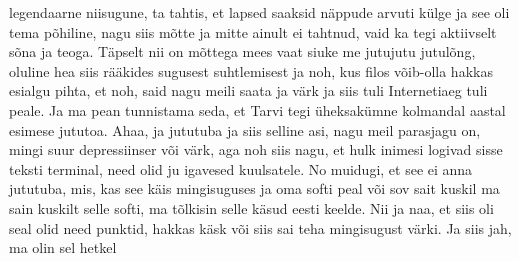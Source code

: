legendaarne niisugune, ta tahtis, et lapsed saaksid näppude arvuti külge ja see oli tema põhiline, nagu siis mõtte ja mitte ainult ei tahtnud, vaid ka tegi aktiivselt sõna ja teoga. Täpselt nii on mõttega mees vaat siuke me jutujutu jutulõng, oluline hea siis rääkides sugusest suhtlemisest ja noh, kus filos võib-olla hakkas esialgu pihta, et noh, said nagu meili saata ja värk ja siis tuli Internetiaeg tuli peale. Ja ma pean tunnistama seda, et Tarvi tegi üheksakümne kolmandal aastal esimese jututoa. Ahaa, ja jututuba ja siis selline asi, nagu meil parasjagu on, mingi suur depressiinser või värk, aga noh siis nagu, et hulk inimesi logivad sisse teksti terminal, need olid ju igavesed kuulsatele. No muidugi, et see ei anna jututuba, mis, kas see käis mingisuguses ja oma softi peal või sov sait kuskil ma sain kuskilt selle softi, ma tõlkisin selle käsud eesti keelde. Nii ja naa, et siis oli seal olid need punktid, hakkas käsk või siis sai teha mingisugust värki. Ja siis jah, ma olin sel hetkel
